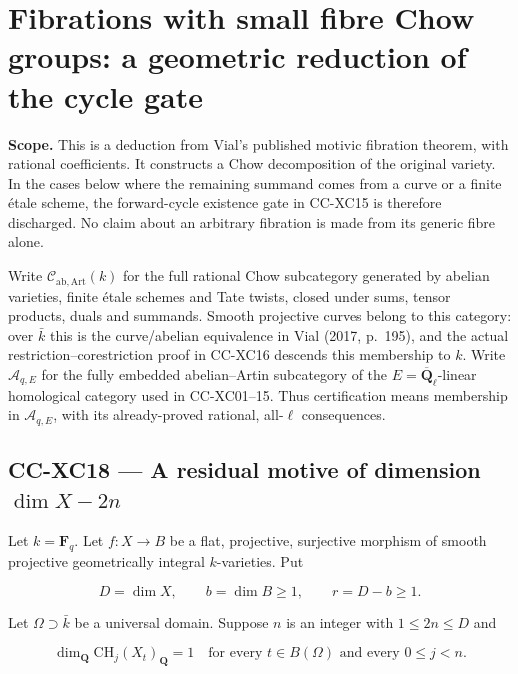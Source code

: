 \section{Fibrations with small fibre Chow groups: a geometric reduction
of the cycle
gate}\label{fibrations-with-small-fibre-chow-groups-a-geometric-reduction-of-the-cycle-gate}

\textbf{Scope.} This is a deduction from Vial's published motivic
fibration theorem, with rational coefficients. It constructs a Chow
decomposition of the original variety. In the cases below where the
remaining summand comes from a curve or a finite étale scheme, the
forward-cycle existence gate in CC-XC15 is therefore discharged. No
claim about an arbitrary fibration is made from its generic fibre alone.

Write \(\mathcal C_{\mathrm{ab,Art}}(k)\) for the full rational Chow
subcategory generated by abelian varieties, finite étale schemes and
Tate twists, closed under sums, tensor products, duals and summands.
Smooth projective curves belong to this category: over \(\bar k\) this
is the curve/abelian equivalence in Vial (2017, p.~195), and the actual
restriction--corestriction proof in CC-XC16 descends this membership to
\(k\). Write \(\mathcal A_{q,E}\) for the fully embedded abelian--Artin
subcategory of the \(E=\overline{\mathbf Q}_\ell\)-linear homological
category used in CC-XC01--15. Thus certification means membership in
\(\mathcal A_{q,E}\), with its already-proved rational, all-\(\ell\)
consequences.

\subsection{\texorpdfstring{CC-XC18 --- A residual motive of dimension
\(\dim X-2n\)}{CC-XC18 --- A residual motive of dimension \textbackslash dim X-2n}}\label{cc-xc18-a-residual-motive-of-dimension-dim-x-2n}

Let \(k=\mathbf F_q\). Let \(f:X\to B\) be a flat, projective,
surjective morphism of smooth projective geometrically integral
\(k\)-varieties. Put

\[
       D=\dim X,\qquad b=\dim B\ge1,\qquad r=D-b\ge1.
 \tag{CC-XC.Q1}
\]

Let \(\Omega\supset\bar k\) be a universal domain. Suppose \(n\) is an
integer with \(1\le 2n\le D\) and

\[
 \dim_{\mathbf Q}\mathrm{CH}_j(X_t)_{\mathbf Q}=1
 \quad\text{for every }t\in B(\Omega)\text{ and every }0\le j<n.
 \tag{CC-XC.Q2}
\]

